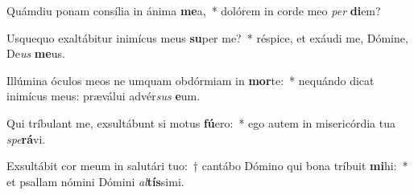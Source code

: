 \item Quámdiu ponam consília in ánima \textbf{me}a,~* dolórem in corde meo \textit{per} \textbf{di}em?
\item Usquequo exaltábitur inimícus meus \textbf{su}per me?~* réspice, et exáudi me, Dómine, De\textit{us} \textbf{me}us.
\item Illúmina óculos meos ne umquam obdórmiam in \textbf{mor}te:~* nequándo dicat inimícus meus: præválui advér\textit{sus} \textbf{e}um.
\item Qui tríbulant me, exsultábunt si motus \textbf{fú}ero:~* ego autem in misericórdia tua \textit{spe}\textbf{rá}vi.
\item Exsultábit cor meum in salutári tuo:~† cantábo Dómino qui bona tríbuit \textbf{mi}hi:~* et psallam nómini Dómini \textit{al}\textbf{tís}simi.
